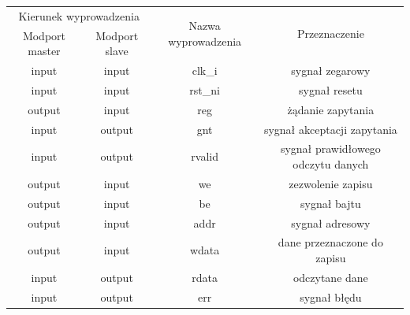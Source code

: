 \documentclass[11pt,a4paper]{article}
\begin{document}
\begin{minipage}{\textwidth}
\begin{center}
			\small
				\begin{tabular}{|c|c|c|c|}
					\hline
					\multicolumn{2}{|c|}{Kierunek wyprowadzenia} & \multirow{2}{*}{Nazwa wyprowadzenia} & \multirow{2}{*}{Przeznaczenie}\\
					\cline{1-2}
					Modport master & Modport slave & & \\ 
					\hline
					input & input & clk\_i & sygnał zegarowy \\
					\hline
					input & input & rst\_ni & sygnał resetu \\
					\hline
					output & input & reg & żądanie zapytania\\
					\hline
					input & output & gnt & sygnał akceptacji zapytania\\
					\hline
					input & output & rvalid & sygnał prawidłowego odczytu danych\\
					\hline
					output & input & we & zezwolenie zapisu\\
					\hline
					output & input & be & sygnał bajtu\\
					\hline
					output & input & addr & sygnał adresowy\\
					\hline
					output & input & wdata & dane przeznaczone do zapisu\\
					\hline
					input & output & rdata & odczytane dane\\
					\hline
					input & output & err & sygnał błędu\\
					\hline
				\end{tabular}
				\end{center}
		\end{minipage}
\end{document}
